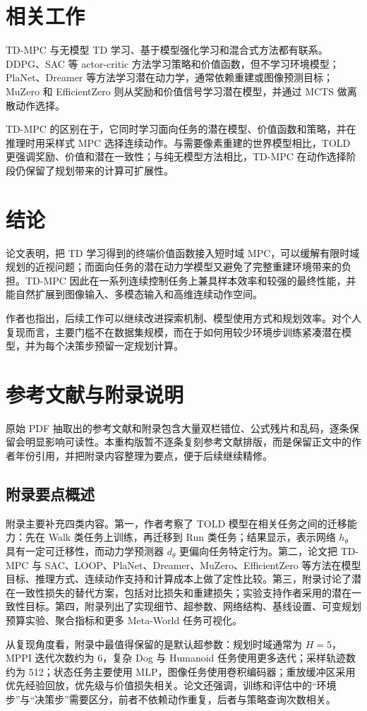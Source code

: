 \documentclass[10pt]{article}
\begin{document}
\section{相关工作}
TD-MPC 与无模型 TD 学习、基于模型强化学习和混合式方法都有联系。DDPG、SAC 等 actor-critic 方法学习策略和价值函数，但不学习环境模型；PlaNet、Dreamer 等方法学习潜在动力学，通常依赖重建或图像预测目标；MuZero 和 EfficientZero 则从奖励和价值信号学习潜在模型，并通过 MCTS 做离散动作选择。

TD-MPC 的区别在于，它同时学习面向任务的潜在模型、价值函数和策略，并在推理时用采样式 MPC 选择连续动作。与需要像素重建的世界模型相比，TOLD 更强调奖励、价值和潜在一致性；与纯无模型方法相比，TD-MPC 在动作选择阶段仍保留了规划带来的计算可扩展性。

\section{结论}
论文表明，把 TD 学习得到的终端价值函数接入短时域 MPC，可以缓解有限时域规划的近视问题；而面向任务的潜在动力学模型又避免了完整重建环境带来的负担。TD-MPC 因此在一系列连续控制任务上兼具样本效率和较强的最终性能，并能自然扩展到图像输入、多模态输入和高维连续动作空间。

作者也指出，后续工作可以继续改进探索机制、模型使用方式和规划效率。对个人复现而言，主要门槛不在数据集规模，而在于如何用较少环境步训练紧凑潜在模型，并为每个决策步预留一定规划计算。


\section*{参考文献与附录说明}
原始 PDF 抽取出的参考文献和附录包含大量双栏错位、公式残片和乱码，逐条保留会明显影响可读性。本重构版暂不逐条复刻参考文献排版，而是保留正文中的作者年份引用，并把附录内容整理为要点，便于后续继续精修。

\subsection*{附录要点概述}
附录主要补充四类内容。第一，作者考察了 TOLD 模型在相关任务之间的迁移能力：先在 Walk 类任务上训练，再迁移到 Run 类任务；结果显示，表示网络 $h_\theta$ 具有一定可迁移性，而动力学预测器 $d_\theta$ 更偏向任务特定行为。第二，论文把 TD-MPC 与 SAC、LOOP、PlaNet、Dreamer、MuZero、EfficientZero 等方法在模型目标、推理方式、连续动作支持和计算成本上做了定性比较。第三，附录讨论了潜在一致性损失的替代方案，包括对比损失和重建损失；实验支持作者采用的潜在一致性目标。第四，附录列出了实现细节、超参数、网络结构、基线设置、可变规划预算实验、聚合指标和更多 Meta-World 任务可视化。

从复现角度看，附录中最值得保留的是默认超参数：规划时域通常为 $H=5$，MPPI 迭代次数约为 6，复杂 Dog 与 Humanoid 任务使用更多迭代；采样轨迹数约为 512；状态任务主要使用 MLP，图像任务使用卷积编码器；重放缓冲区采用优先经验回放，优先级与价值损失相关。论文还强调，训练和评估中的“环境步”与“决策步”需要区分，前者不依赖动作重复，后者与策略查询次数相关。
\end{document}
